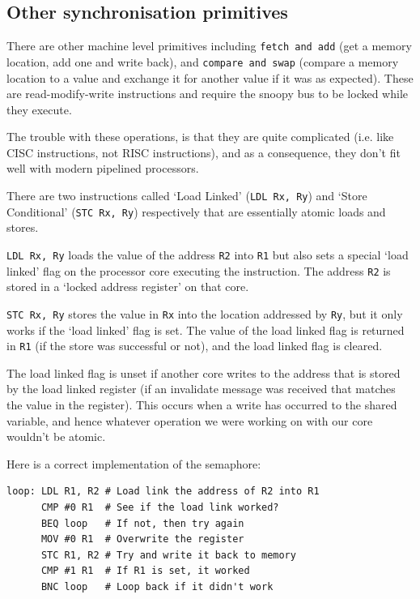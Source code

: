 \subsection{Other synchronisation primitives}

There are other machine level primitives including \texttt{fetch and
add} (get a memory location, add one and write back),
and \texttt{compare and swap} (compare a memory location to a value
and exchange it for another value if it was as expected). These are
read-modify-write instructions and require the snoopy bus to be locked
while they execute.

The trouble with these operations, is that they are quite complicated
(i.e. like CISC instructions, not RISC instructions), and as a
consequence, they don't fit well with modern pipelined processors.

There are two instructions called `Load Linked' (\texttt{LDL Rx, Ry})
and `Store Conditional' (\texttt{STC Rx, Ry}) respectively that are
essentially atomic loads and stores.

\texttt{LDL Rx, Ry} loads the value of the address \texttt{R2}
into \texttt{R1} but also sets a special `load linked' flag on the
processor core executing the instruction. The address \texttt{R2} is
stored in a `locked address register' on that core.

\texttt{STC Rx, Ry} stores the value in \texttt{Rx} into the location
addressed by \texttt{Ry}, but it only works if the `load linked' flag
is set. The value of the load linked flag is returned in \texttt{R1}
(if the store was successful or not), and the load linked flag is
cleared.

The load linked flag is unset if another core writes to the address
that is stored by the load linked register (if an invalidate message
was received that matches the value in the register). This occurs when
a write has occurred to the shared variable, and hence whatever
operation we were working on with our core wouldn't be atomic.

Here is a correct implementation of the semaphore:

\begin{verbatim}
loop: LDL R1, R2 # Load link the address of R2 into R1
      CMP #0 R1  # See if the load link worked?
      BEQ loop   # If not, then try again
      MOV #0 R1  # Overwrite the register
      STC R1, R2 # Try and write it back to memory
      CMP #1 R1  # If R1 is set, it worked
      BNC loop   # Loop back if it didn't work
\end{verbatim}


